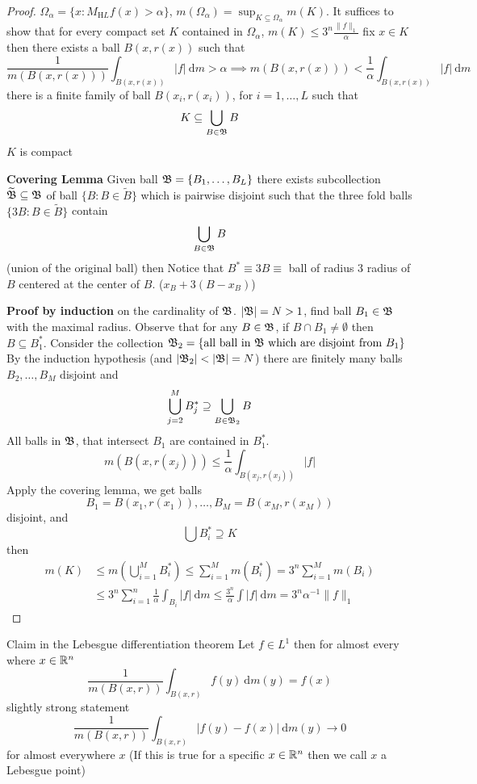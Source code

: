 \begin{proof}
  $\Omega_\alpha = \{x : M_{\mathrm HL}f(x) > \alpha\}$,
  $m(\Omega_\alpha) = \sup_{K \subseteq \Omega_\alpha} m(K)$.
  It suffices to show that for every compact set $K$ contained in $\Omega_\alpha$, 
  $m(K) \le 3^n \frac{\|f\|_1}\alpha$
  fix $x \in K$ then there exists a ball $B(x, r(x))$ such that 
  \[\frac1{m(B(x, r(x)))} \int_{B(x, r(x))} |f| \ \mathrm{d}m> \alpha \implies m(B(x, r(x))) < \frac1\alpha\int_{{B(x, r(x))}} |f| \ \mathrm dm\]
  there is a finite family of ball $B(x_i, r(x_i))$, for $i = 1, \dotsc, L$ such that 
  \[K \subseteq \bigcup_{B \in \mathfrak B} B\]
  $K$ is compact

  \textbf{Covering Lemma} Given ball $\mathfrak B = \{B_1, \dotsc, B_L\}$ there exists subcollection $\widetilde{\mathfrak B} \subseteq \mathfrak B$
  of ball $\{B : B \in \widetilde{B}\}$ which is pairwise disjoint such that the three fold balls
  $\{3B : B \in \widetilde{B}\}$ contain 
  \[\bigcup_{B \in \mathfrak B} B\]
  (union of the original ball) then
  Notice that $B^* \equiv 3B\equiv$ ball of radius 3 radius of $B$ centered at the center of $B$.
  ($x_B + 3(B - x_B)$) 

  \textbf{Proof by induction} on the cardinality of $\mathfrak B$. $|\mathfrak B| = N > 1$,
  find ball $B_1 \in \mathfrak B$ with the maximal radius. Observe that for any $B \in \mathfrak B$, if $B \cap B_1 \neq \emptyset$
  then $B \subseteq B_1^*$.
  Consider the collection $\mathfrak B_{2} = \{\text{all ball in } \mathfrak B \text{ which are disjoint from }B_1\}$
  By the induction hypothesis (and $|\mathfrak B_2| < |\mathfrak B| = N$)
  there are finitely many balls $B_2, \dotsc, B_M$ disjoint and 
  \[\bigcup_{j=2}^M B_j^* \supseteq \bigcup_{B \in \mathfrak B_2}B\]
  All balls in $\mathfrak B$, that intersect $B_1$ are contained in $B_1^*$.
  \[m(B(x, r(x_j))) \le \frac1\alpha \int_{B(x_j, r(x_j))} |f|\]
  Apply the covering lemma, we get balls
  \[B_1 = B(x_1, r(x_1)), \dotsc, B_M = B(x_M, r(x_M))\]
  disjoint, and 
  \[\bigcup B_i^* \supseteq K\]
  then 
  \begin{align*}
    m(K) &\le m\left(\bigcup_{i=1}^M B_i^*\right) 
    \le \sum_{i=1}^M m(B_i^*)  = 3^n \sum_{i=1}^Mm(B_i) \\
    &\le 3^n\sum_{i=1}^n\frac1\alpha \int_{B_i} |f| \ \mathrm{d}m\le \frac{3^n}\alpha \int|f|\ \mathrm{d}m = 3^n\alpha^{-1}\|f\|_{1}
  \end{align*}
\end{proof}



Claim in the Lebesgue differentiation theorem
Let $f \in L^1$ then for almost every where $x \in \mathbb R^n$ 
\[\frac1{m(B(x, r))}\int_{B(x, r)} f(y) \ \mathrm{d}m(y) = f(x)\]
slightly strong statement
\[\frac1{m(B(x, r))}\int_{B(x, r)} |f(y) - f(x)| \ \mathrm{d}m(y) \to 0\]
for almost everywhere $x$ (If this is true for a specific $x \in \mathbb R^n$ then we call $x$ a Lebesgue point)

